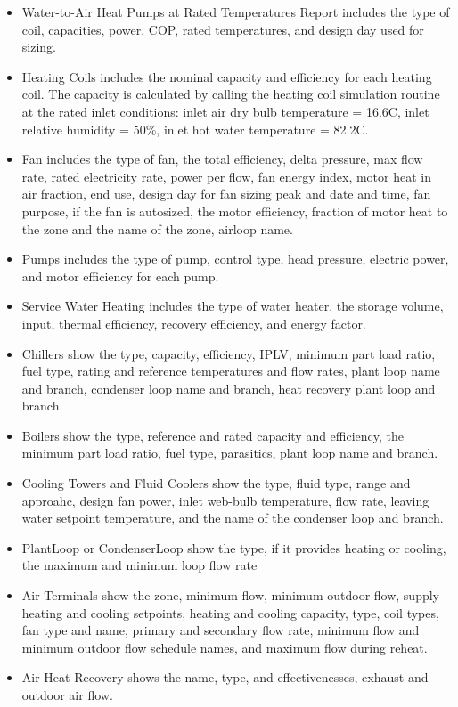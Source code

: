 \begin{itemize}
\item
  Water-to-Air Heat Pumps at Rated Temperatures Report includes the type of coil, capacities, power, COP, rated temperatures, and design day used for sizing.
\item
  Heating Coils includes the nominal capacity and efficiency for each heating coil. The capacity is calculated by calling the heating coil simulation routine at the rated inlet conditions: inlet air dry bulb temperature = 16.6C, inlet relative humidity = 50\%, inlet hot water temperature = 82.2C.
\item
  Fan includes the type of fan, the total efficiency, delta pressure, max flow rate, rated electricity rate, power per flow, fan energy index, motor heat in air fraction, end use, design day for fan sizing peak and date and time, fan purpose, if the fan is autosized, the motor efficiency, fraction of motor heat to the zone and the name of the zone, airloop name.
\item
  Pumps includes the type of pump, control type, head pressure, electric power, and motor efficiency for each pump.
\item
  Service Water Heating includes the type of water heater, the storage volume, input, thermal efficiency, recovery efficiency, and energy factor.
\item
  Chillers show the type, capacity, efficiency, IPLV, minimum part load ratio, fuel type, rating and reference temperatures and flow rates, plant loop name and branch, condenser loop name and branch, heat recovery plant loop and branch.
\item
  Boilers show the type, reference and rated capacity and efficiency, the minimum part load ratio, fuel type, parasitics, plant loop name and branch.
\item
  Cooling Towers and Fluid Coolers show the type, fluid type, range and approahc, design fan power, inlet web-bulb temperature, flow rate, leaving water setpoint temperature, and the name of the condenser loop and branch.
\item
  PlantLoop or CondenserLoop show the type, if it provides heating or cooling, the maximum and minimum loop flow rate
\item
  Air Terminals show the zone, minimum flow, minimum outdoor flow, supply heating and cooling setpoints, heating and cooling capacity, type, coil types, fan type and name, primary and secondary flow rate, minimum flow and minimum outdoor flow schedule names, and maximum flow during reheat.
\item
  Air Heat Recovery shows the name, type, and effectivenesses, exhaust and outdoor air flow.

\end{itemize}

